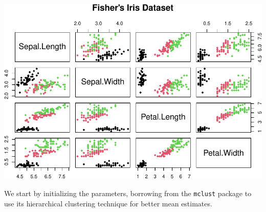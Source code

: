 \documentclass[12pt]{article}
\begin{document}
\includegraphics{CassieJin_FinalPaper_files/figure-latex/unnamed-chunk-5-1.pdf}

We start by initializing the parameters, borrowing from the
\texttt{mclust} package to use its hierarchical clustering technique for
better mean estimates.
\end{document}
